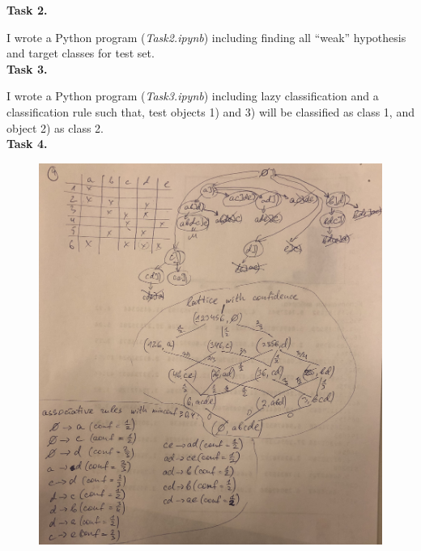 \documentclass{article}
\begin{document}
\textbf{Task 2.}

I wrote a Python program (\textit{Task2.ipynb}) including finding all “weak” hypothesis and target classes for test set.\\

\textbf{Task 3.}

I wrote a Python program (\textit{Task3.ipynb}) including lazy classification and a classification rule such that, test objects 1) and 3) will be classified as class 1, and object 2) as class 2.\\

\textbf{Task 4.}

\begin{figure}[h!]
	\includegraphics[width=15cm]{4.jpg}
\end{figure}

 
\end{document}
